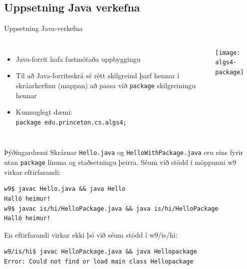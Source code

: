 \documentclass[handout]{beamer}
\begin{document}

\subsection{Uppsetning Java verkefna}

\begin{frame}{Uppsetning Java-verkefna}
	\begin{columns}
		\begin{itemize}
			\item Java-forrit hafa fastmótaða uppbyggingu
			\item Til að Java-forritsskrá sé rétt skilgreind þarf hennar í skráarkerfinu (mappan) að passa við \texttt{package} skilgreiningu hennar
			\item Kunnuglegt dæmi:\\ \texttt{\scriptsize package edu.princeton.cs.algs4;}
		\end{itemize}
		\texttt{[image: algs4-package]}
	\end{columns}
\end{frame}

\begin{frame}[fragile]{Þýðingardæmi}
	Skrárnar \texttt{Hello.java} og \texttt{HelloWithPackage.java} eru eins fyrir utan \texttt{package} línuna og staðsetningu þeirra. Séum við stödd í möppunni w9 virkar eftirfarandi:

	\begin{verbatim}
w9$ javac Hello.java && java Hello
Halló heimur!
w9$ javac is/hi/HelloPackage.java && java is/hi/HelloPackage
Halló heimur!
\end{verbatim}
	En eftirfarandi virkar ekki þó við séum stödd í w9/is/hi:
	\begin{verbatim}
w9/is/hi$ javac HelloPackage.java && java Hellopackage
Error: Could not find or load main class Hellopackage
\end{verbatim}
\end{frame}
\end{document}
